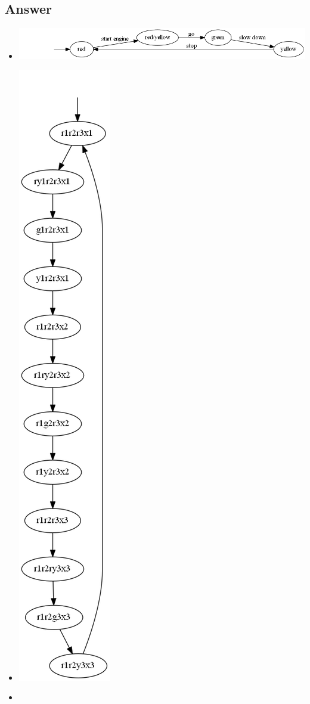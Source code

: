 \documentclass[12pt]{article}
\begin{document}
\subsection*{Answer}
\begin{itemize}
	\item \begin{centering}
		\includegraphics*[width=\linewidth]{23a.png}
	\end{centering}
	\item \begin{centering}
		\includegraphics*[scale=0.5]{23b.png}
	\end{centering}
	\item 
\end{itemize}
\end{document}
